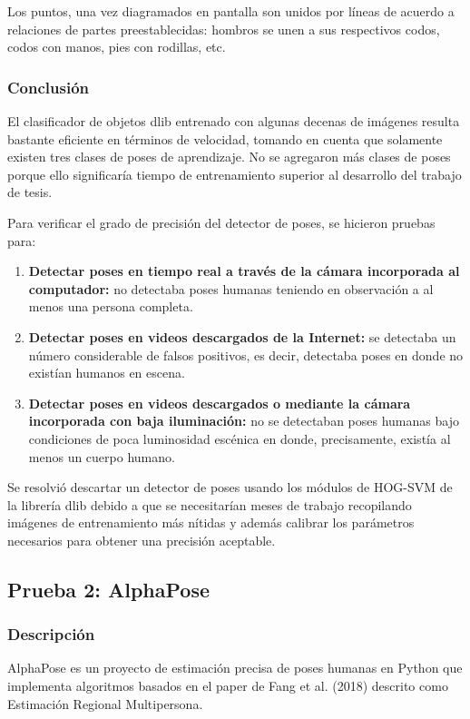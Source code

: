 \documentclass[a4paper,12pt,oneside,spanish]{book}
\begin{document}
Los puntos, una vez diagramados en pantalla son unidos por líneas de acuerdo a relaciones de partes preestablecidas: hombros se unen a sus respectivos codos, codos con manos, pies con rodillas, etc.\par

\subsubsection{Conclusión}
El clasificador de objetos dlib entrenado con algunas decenas de imágenes resulta bastante eficiente en términos de velocidad, tomando en cuenta que solamente existen tres clases de poses de aprendizaje. No se agregaron más clases de poses porque ello significaría tiempo de entrenamiento superior al desarrollo del trabajo de tesis.\par

Para verificar el grado de precisión del detector de poses, se hicieron pruebas para:
 \begin{enumerate}
 	\item \textbf{Detectar poses en tiempo real a través de la cámara incorporada al computador:} no detectaba poses humanas teniendo en observación a al menos una persona completa.
 	\item \textbf{Detectar poses en videos descargados de la Internet:} se detectaba un número considerable de falsos positivos, es decir, detectaba poses en donde no existían  humanos en escena.
	\item \textbf{Detectar poses en videos descargados o mediante la cámara incorporada con baja iluminación:} no se detectaban poses humanas bajo condiciones de poca luminosidad escénica en donde, precisamente, existía al menos un cuerpo humano.
\end{enumerate}

Se resolvió descartar un detector de poses usando los módulos de HOG-SVM de la librería dlib debido a que se necesitarían meses de trabajo recopilando imágenes de entrenamiento más nítidas y además calibrar los parámetros necesarios para obtener una precisión aceptable.\par

\subsection{Prueba 2: AlphaPose}
\subsubsection{Descripción}
AlphaPose es un proyecto de estimación precisa de poses humanas en Python que implementa algoritmos basados en el paper de Fang et al. (2018) descrito como Estimación Regional Multipersona.\par
\end{document}
